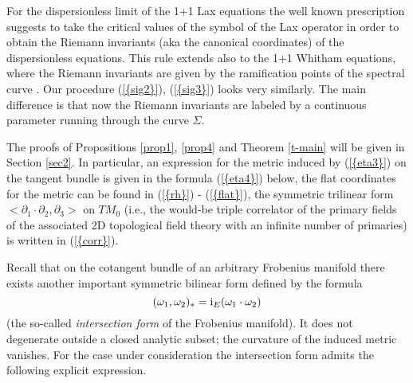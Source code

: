 \documentclass[numbook, envcountsame, envcountreset]{svjour3}
\begin{document}
\begin{remark} For the dispersionless limit of the 1+1 Lax equations the well known prescription suggests to take the critical values of the symbol of the Lax operator in order to obtain the Riemann invariants (aka the canonical coordinates) of the dispersionless equations. This rule extends also to the 1+1 Whitham equations, where the Riemann invariants are given by the ramification points of the spectral curve \cite{ffm}. Our procedure {(\ref{{sig2}})}, {(\ref{{sig3}})} looks very similarly. The main difference is that now the Riemann invariants are labeled by a continuous parameter running through the curve $\Sigma$.
\end{remark}

The proofs of Propositions \ref{prop1}, \ref{prop4} and Theorem \ref{t-main} will be given in Section \ref{sec2}. In particular, an expression for the metric induced by {(\ref{{eta3}})} on the tangent bundle is given in the formula {(\ref{{eta4}})} below, the flat coordinates for the metric can be found in {(\ref{{rh}})} - {(\ref{{flat}})}, the symmetric trilinear form $<{\partial}_1\cdot {\partial}_2, {\partial}_3>$ on $TM_0$ (i.e., the would-be triple correlator  \cite{wi} of the primary fields of the associated 2D topological field theory with an infinite number of primaries) is written in {(\ref{{corr}})}.

Recall \cite{icm} that on the cotangent bundle of an arbitrary Frobenius manifold there exists another important symmetric bilinear form defined by the formula
\begin{equation}\label{inter}
(\omega_1, \omega_2)_* = {\rm i}_E(\omega_1\cdot \omega_2)
\end{equation}
(the so-called {\it intersection form} of the Frobenius manifold). It does not degenerate outside a closed analytic subset; the curvature of the induced metric vanishes. For the case under consideration the intersection form admits the following explicit expression.
\end{document}
